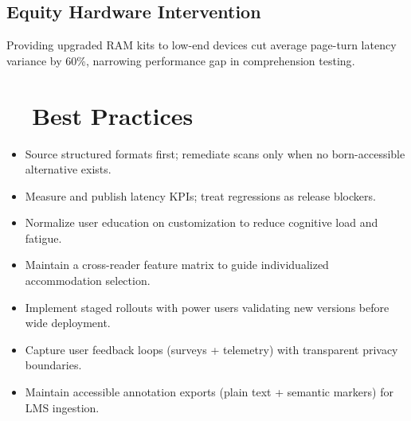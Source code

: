 \subsection*{Equity Hardware Intervention}
Providing upgraded RAM kits to low-end devices cut average page-turn latency variance by 60\%, narrowing performance gap in comprehension testing\supercite{EquityViolationData, EducationalEquityReport2024}.

\section{~~Best Practices}
\label{sec:sr27-best-practices}
\begin{itemize}
	\item Source structured formats first; remediate scans only when no born-accessible alternative exists.
	\item Measure and publish latency KPIs; treat regressions as release blockers.
	\item Normalize user education on customization to reduce cognitive load and fatigue.
	\item Maintain a cross-reader feature matrix to guide individualized accommodation selection.
	\item Implement staged rollouts with power users validating new versions before wide deployment.
	\item Capture user feedback loops (surveys + telemetry) with transparent privacy boundaries.
	\item Maintain accessible annotation exports (plain text + semantic markers) for LMS ingestion.
\end{itemize}

